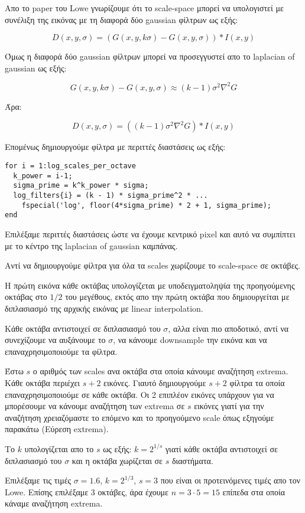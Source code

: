 \documentclass[11pt]{scrartcl} %
\begin{document}
Απο το paper του Lowe γνωρίζουμε ότι το scale-space μπορεί να υπολογιστεί με συνέλιξη της εικόνας με τη διαφορά δύο gaussian φίλτρων ως εξής:

\[D(x,y,\sigma) = (G(x,y,k\sigma) − G(x,y,\sigma)) * I(x,y)\]

Όμως η διαφορά δύο gaussian φίλτρων μπορεί να προσεγγυστεί απο το laplacian of gaussian ως εξής:

\[G(x,y,k\sigma) − G(x,y,\sigma) \approx (k−1)\sigma^2 \nabla^2 G\]

Άρα:

\[D(x,y,\sigma) = ((k−1)\sigma^2 \nabla^2 G) * I(x,y)\]

Επομένως δημιουργούμε φίλτρα με περιττές διαστάσεις ως εξής:

\begin{verbatim}
for i = 1:log_scales_per_octave
  k_power = i-1;
  sigma_prime = k^k_power * sigma;
  log_filters{i} = (k - 1) * sigma_prime^2 * ...
    fspecial('log', floor(4*sigma_prime) * 2 + 1, sigma_prime);
end
\end{verbatim}

Επιλέξαμε περιττές διαστάσεις ώστε να έχουμε κεντρικό pixel και αυτό να συμπίπτει με το κέντρο της laplacian of gaussian καμπάνας.

Αντί να δημιουργούμε φίλτρα για όλα τα scales χωρίζουμε το scale-space σε οκτάβες.

Η πρώτη εικόνα κάθε οκτάβας υπολογίζεται με υποδειγματοληψία της προηγούμενης οκτάβας στο $1/2$ του μεγέθους, εκτός απο την πρώτη οκτάβα που δημιουργείται με διπλασιασμό της αρχικής εικόνας με linear interpolation.

Κάθε οκτάβα αντιστοιχεί σε διπλασιασμό του $\sigma$, αλλα είναι πιο αποδοτικό, αντί να συνεχίζουμε να αυξάνουμε το $\sigma$, να κάνουμε downsample την εικόνα και να επαναχρησιμοποιούμε τα φίλτρα.

Έστω $s$ ο αριθμός των scales ανα οκτάβα στα οποία κάνουμε αναζήτηση extrema.
Κάθε οκτάβα περιέχει $s+2$ εικόνες. Γιαυτό δημιουργούμε $s+2$ φίλτρα τα οποία επαναχρησιμοποιούμε σε κάθε οκτάβα.
Οι 2 επιπλέον εικόνες υπάρχουν για να μπορέσουμε να κάνουμε αναζήτηση των extrema σε $s$ εικόνες γιατί για την αναζήτηση χρειαζόμαστε το επόμενο και το προηγούμενο scale όπως εξηγούμε παρακάτω (Εύρεση extrema).

Το $k$ υπολογίζεται απο το $s$ ως εξής: $k = 2^{1/s}$ γιατί κάθε οκτάβα αντιστοιχεί σε διπλασιασμό του $\sigma$ και η οκτάβα χωρίζεται σε $s$ διαστήματα.

Επιλέξαμε τις τιμές $\sigma = 1.6$, $k = 2^{1/3}$, $s = 3$ που είναι οι προτεινόμενες τιμές απο τον Lowe.
Επίσης επιλέξαμε $3$ οκτάβες, άρα έχουμε $n = 3 \cdot 5 = 15$ επίπεδα στα οποία κάναμε αναζήτηση extrema.
\end{document}
